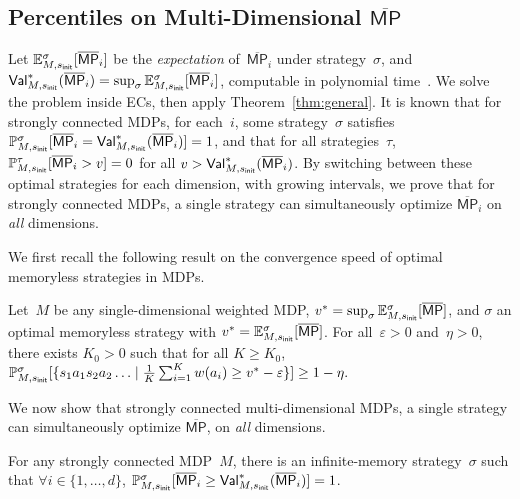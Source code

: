 \documentclass{llncs}
\newcommand{\initState}{\ensuremath{s_{{\sf init}}} }
\newcommand*{\pr}{\mathbb{P}}
\newcommand*{\mpsup}{\ensuremath{\overline{\mathsf{MP}}}}
\newcommand*{\expect}{\mathbb{E}}
\newcommand\Val{\textrm{\sf Val}}
\begin{document}
\subsection{Percentiles on Multi-Dimensional $\mpsup$}

Let $\expect_{M,\initState}^\sigma[\mpsup_i]$ be the \emph{expectation} of~$\mpsup_i$ under strategy~$\sigma$,
and $\Val_{M,\initState}^*(\mpsup_i)=\sup_{\sigma} \expect_{M,\initState}^\sigma[\mpsup_i]$, computable in polynomial time~\cite{Puterman-wiley94}.
We solve the problem inside ECs, then apply Theorem~\ref{thm:general}.
It is known that for strongly connected MDPs, for each~$i$, some strategy~$\sigma$ satisfies $\pr_{M,\initState}^\sigma[\mpsup_i = \Val^*_{M,\initState}(\mpsup_i)]=1$,
and that for all strategies~$\tau$, $\pr_{M,\initState}^\tau[\mpsup_i>v]=0$ for all $v>\Val^*_{M,\initState}(\mpsup_i)$.
By switching between these optimal strategies for each dimension, with growing
intervals, we prove that
for strongly connected MDPs, a single strategy can simultaneously optimize $\mpsup_i$ on \emph{all} dimensions.

We first recall the following result on the convergence speed of optimal memoryless strategies
in MDPs.

\begin{lemma}
  \label{lemma:boundk}
  Let~$M$ be any single-dimensional weighted MDP, $v^* = \sup_{\sigma} \expect_{M,\initState}^\sigma[\mpsup]$,
  and $\sigma$ an optimal memoryless strategy with $v^* = \expect_{M,\initState}^\sigma[\mpsup]$.
  For all~$\varepsilon>0$ and~$\eta>0$, there exists $K_0>0$ such that  for all $K\geq K_0$,
  \(
  \pr_{M,\initState}^\sigma[\{s_1a_1s_2a_2\ldots \mid \frac{1}{K} \sum_{i=1}^K w(a_i) \geq v^* - \varepsilon\}] \geq 1 - \eta.
  \)
\end{lemma}

We now show that strongly connected multi-dimensional MDPs, a single strategy can simultaneously optimize $\mpsup$, on \textit{all} dimensions.

\begin{lemma}
  For any strongly connected MDP~$M$,  there is an infinite-memory strategy~$\sigma$ such that $\forall i\in\{1,\ldots,d\}$, $\pr_{M,\initState}^\sigma[\mpsup_i \geq \Val_{M,\initState}^*(\mpsup_i)]=1$.
\end{lemma}
\end{document}
